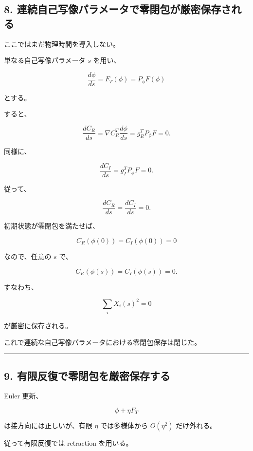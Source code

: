 \documentclass[
  a4paper,
]{ltjsarticle}
\begin{document}
\subsection{8.
連続自己写像パラメータで零閉包が厳密保存される}\label{ux9023ux7d9aux81eaux5df1ux5199ux50cfux30d1ux30e9ux30e1ux30fcux30bfux3067ux96f6ux9589ux5305ux304cux53b3ux5bc6ux4fddux5b58ux3055ux308cux308b}

ここではまだ物理時間を導入しない。

単なる自己写像パラメータ \(s\) を用い、

\[
\boxed{
\frac{d\phi}{ds}
=
F_T(\phi)
=
P_\phi F(\phi)
}
\tag{25}
\]

とする。

すると、

\[
\frac{dC_R}{ds}
=
\nabla C_R^T
\frac{d\phi}{ds}
=
g_R^TP_\phi F
=
0.
\]

同様に、

\[
\frac{dC_I}{ds}
=
g_I^TP_\phi F
=
0.
\]

従って、

\[
\boxed{
\frac{dC_R}{ds}
=
\frac{dC_I}{ds}
=
0.
}
\tag{26}
\]

初期状態が零閉包を満たせば、

\[
C_R(\phi(0))=C_I(\phi(0))=0
\]

なので、任意の \(s\) で、

\[
\boxed{
C_R(\phi(s))
=
C_I(\phi(s))
=
0.
}
\tag{27}
\]

すなわち、

\[
\boxed{
\sum_iX_i(s)^2=0
}
\tag{28}
\]

が厳密に保存される。

これで連続な自己写像パラメータにおける零閉包保存は閉じた。

\begin{center}\rule{0.5\linewidth}{0.5pt}\end{center}

\subsection{9.
有限反復で零閉包を厳密保存する}\label{ux6709ux9650ux53cdux5fa9ux3067ux96f6ux9589ux5305ux3092ux53b3ux5bc6ux4fddux5b58ux3059ux308b}

Euler 更新、

\[
\phi+\eta F_T
\]

は接方向には正しいが、有限 \(\eta\) では多様体から \(O(\eta^2)\)
だけ外れる。

従って有限反復では retraction を用いる。
\end{document}
